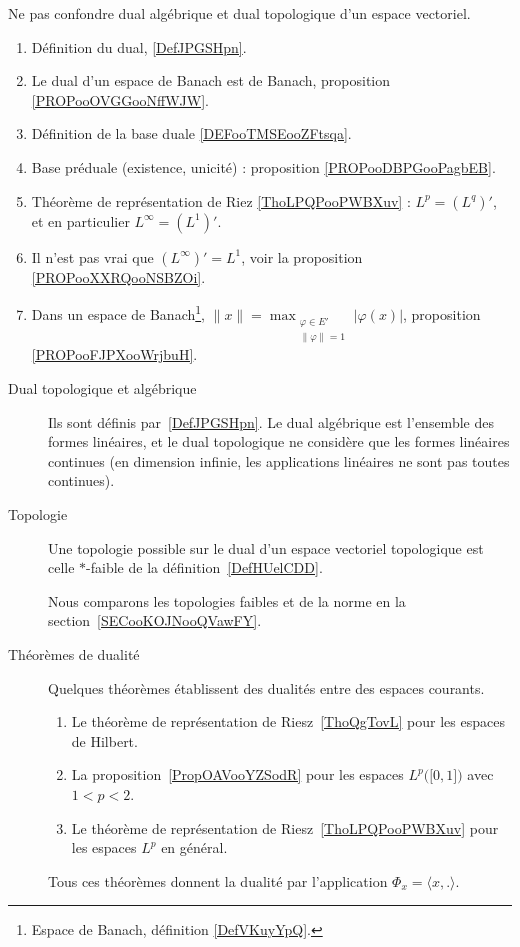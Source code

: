 
     \label{THEMEooULGFooPscFJC}

Ne pas confondre dual algébrique et dual topologique d'un espace vectoriel.

\begin{enumerate}
    \item
        Définition du dual, \ref{DefJPGSHpn}.
    \item
        Le dual d'un espace de Banach est de Banach, proposition \ref{PROPooOVGGooNffWJW}.
	\item
	      Définition de la base duale \ref{DEFooTMSEooZFtsqa}.
	\item
	      Base préduale (existence, unicité) : proposition \ref{PROPooDBPGooPagbEB}.
	\item
	      Théorème de représentation de Riez \ref{ThoLPQPooPWBXuv} : \( L^p=(L^q)'\), et en particulier \( L^{\infty}=(L^1)'\).
	\item
	      Il n'est pas vrai que \( (L^{\infty})'=L^1\), voir la proposition \ref{PROPooXXRQooNSBZOi}.
      \item
          Dans un espace de Banach\footnote{Espace de Banach, définition \ref{DefVKuyYpQ}.}, \( \| x \|=\max_{\substack{\varphi\in E'\\\| \varphi \|=1}}| \varphi(x) |\), proposition \ref{PROPooFJPXooWrjbuH}.
\end{enumerate}

\begin{description}
	\item[Dual topologique et algébrique]
	      Ils sont définis par~\ref{DefJPGSHpn}. Le dual algébrique est l'ensemble des formes linéaires, et le dual topologique ne considère que les formes linéaires continues (en dimension infinie, les applications linéaires ne sont pas toutes continues).
	\item[Topologie]
	      Une topologie possible sur le dual d'un espace vectoriel topologique est celle \( *\)-faible de la définition~\ref{DefHUelCDD}.

	      Nous comparons les topologies faibles et de la norme en la section~\ref{SECooKOJNooQVawFY}.
	\item[Théorèmes de dualité]
	      Quelques théorèmes établissent des dualités entre des espaces courants.
	      \begin{enumerate}
		      \item
		            Le théorème de représentation de Riesz~\ref{ThoQgTovL} pour les espaces de Hilbert.
		      \item
		            La proposition~\ref{PropOAVooYZSodR} pour les espaces \( L^p\big( \mathopen[ 0 , 1 \mathclose] \big)\) avec \( 1<p<2\).
		      \item
		            Le théorème de représentation de Riesz~\ref{ThoLPQPooPWBXuv} pour les espaces \( L^p\) en général.
	      \end{enumerate}
	      Tous ces théorèmes donnent la dualité par l'application \( \Phi_x=\langle x, .\rangle \).

\end{description}
